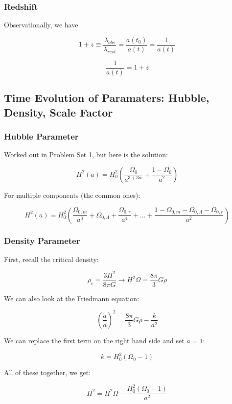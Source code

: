 \documentclass{article}
\newcommand{\be}{\begin{equation}}
\newcommand{\ee}{\end{equation}}
\begin{document}
\subsubsection{Redshift}

Observationally, we have

\be
1+z \equiv \frac{\lambda_{obs}}{\lambda_{rest}} = \frac{a(t_0)}{a(t)} = \frac{1}{a(t)}
\ee

\be
\boxed{\frac{1}{a(t)} = 1+z}
\ee

\subsection{Time Evolution of Paramaters: Hubble, Density, Scale Factor}

\subsubsection{Hubble Parameter}

Worked out in Problem Set 1, but here is the solution:

\be
H^2(a) = H_0^2 \left(\frac{\Omega_0}{a^{3+3w}} + \frac{1-\Omega_0}{a^2}\right)
\ee

For multiple components (the common ones):

\be
H^2(a) = H_0^2 \left(\frac{\Omega_{0,m}}{a^{3}} + \Omega_{0,\Lambda} + \frac{\Omega_{0,r}}{a^{4}}+ ... + \frac{1-\Omega_{0,m}-\Omega_{0,\Lambda}-\Omega_{0,r}}{a^2}\right)
\ee

\subsubsection{Density Parameter}

First, recall the critical density:

\be
\rho_c = \frac{3 H^2}{8\pi G} \rightarrow H^2 \Omega = \frac{8\pi}{3}G\rho
\ee

We can also look at the Friedmann equation:

\begin{equation}
    \left(\frac{\dot a}{a}\right)^2 = \frac{8\pi}{3}G\rho - \frac{k}{a^2}
\end{equation}

We can replace the first term on the right hand side and set $a=1$:

\be
k = H_0^2 \left(\Omega_0-1\right)
\ee

All of these together, we get:

\be
H^2 = H^2 \Omega - \frac{H_0^2 \left(\Omega_0-1\right)}{a^2}
\ee
\end{document}
